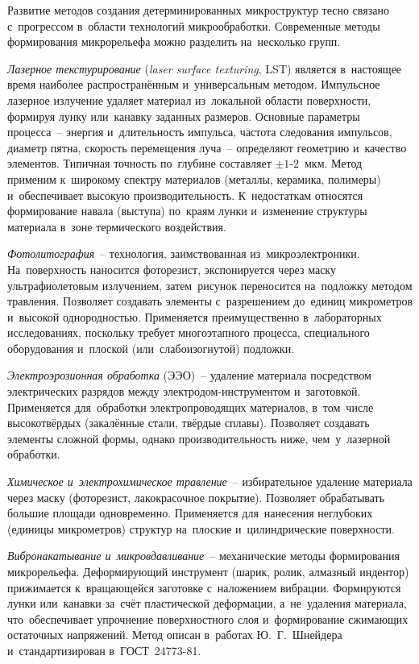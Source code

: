 Развитие методов создания детерминированных микроструктур тесно связано с~прогрессом в~области технологий микрообработки. Современные методы формирования микрорельефа можно разделить на~несколько групп.

\textit{Лазерное текстурирование} (\textit{laser surface texturing}, LST) является в~настоящее время наиболее распространённым и~универсальным методом. Импульсное лазерное излучение удаляет материал из~локальной области поверхности, формируя лунку или~канавку заданных размеров. Основные параметры процесса~-- энергия и~длительность импульса, частота следования импульсов, диаметр пятна, скорость перемещения луча~-- определяют геометрию и~качество элементов. Типичная точность по~глубине составляет $\pm 1\text{-}2$~мкм. Метод применим к~широкому спектру материалов (металлы, керамика, полимеры) и~обеспечивает высокую производительность. К~недостаткам относятся формирование навала (выступа) по~краям лунки и~изменение структуры материала в~зоне термического воздействия.

\textit{Фотолитография}~-- технология, заимствованная из~микроэлектроники. На~поверхность наносится фоторезист, экспонируется через маску ультрафиолетовым излучением, затем~рисунок переносится на~подложку методом травления. Позволяет создавать элементы с~разрешением до~единиц микрометров и~высокой однородностью. Применяется преимущественно в~лабораторных исследованиях, поскольку требует многоэтапного процесса, специального оборудования и~плоской (или~слабоизогнутой) подложки.

\textit{Электроэрозионная обработка} (ЭЭО)~-- удаление материала посредством электрических разрядов между электродом-инструментом и~заготовкой. Применяется для~обработки электропроводящих материалов, в~том~числе высокотвёрдых (закалённые стали, твёрдые сплавы). Позволяет создавать элементы сложной формы, однако производительность ниже, чем~у~лазерной обработки.

\textit{Химическое и~электрохимическое травление}~-- избирательное удаление материала через маску (фоторезист, лакокрасочное покрытие). Позволяет обрабатывать большие площади одновременно. Применяется для~нанесения неглубоких (единицы микрометров) структур на~плоские и~цилиндрические поверхности.

\textit{Вибронакатывание и~микровдавливание}~-- механические методы формирования микрорельефа. Деформирующий инструмент (шарик, ролик, алмазный индентор) прижимается к~вращающейся заготовке с~наложением вибрации. Формируются лунки или~канавки за~счёт пластической деформации, а~не~удаления материала, что~обеспечивает упрочнение поверхностного слоя и~формирование сжимающих остаточных напряжений. Метод описан в~работах Ю.~Г.~Шнейдера и~стандартизирован в~ГОСТ~24773-81.

